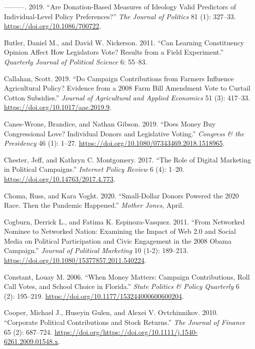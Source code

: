 \documentclass[12pt,]{article}
\begin{document}
\leavevmode\hypertarget{ref-bonica2019}{}%
---------. 2019. ``Are Donation-Based Measures of Ideology Valid
Predictors of Individual-Level Policy Preferences?'' \emph{The Journal
of Politics} 81 (1): 327--33. \url{https://doi.org/10.1086/700722}.

\leavevmode\hypertarget{ref-butler2011}{}%
Butler, Daniel M., and David W. Nickerson. 2011. ``Can Learning
Constituency Opinion Affect How Legislators Vote? Results from a Field
Experiment.'' \emph{Quarterly Journal of Political Science} 6: 55--83.

\leavevmode\hypertarget{ref-callahan2019}{}%
Callahan, Scott. 2019. ``Do Campaign Contributions from Farmers
Influence Agricultural Policy? Evidence from a 2008 Farm Bill Amendment
Vote to Curtail Cotton Subsidies.'' \emph{Journal of Agricultural and
Applied Economics} 51 (3): 417--33.
\url{https://doi.org/10.1017/aae.2019.9}.

\leavevmode\hypertarget{ref-caneswrone2019}{}%
Canes-Wrone, Brandice, and Nathan Gibson. 2019. ``Does Money Buy
Congressional Love? Individual Donors and Legislative Voting.''
\emph{Congress \& the Presidency} 46 (1): 1--27.
\url{https://doi.org/10.1080/07343469.2018.1518965}.

\leavevmode\hypertarget{ref-chester2017}{}%
Chester, Jeff, and Kathryn C. Montgomery. 2017. ``The Role of Digital
Marketing in Political Campaigns.'' \emph{Internet Policy Review} 6 (4):
1--20. \url{https://doi.org/10.14763/2017.4.773}.

\leavevmode\hypertarget{ref-choma2020}{}%
Choma, Russ, and Kara Voght. 2020. ``Small-Dollar Donors Powered the
2020 Race. Then the Pandemic Happened.'' \emph{Mother Jones}, April.

\leavevmode\hypertarget{ref-cogburn2011}{}%
Cogburn, Derrick L., and Fatima K. Espinoza-Vasquez. 2011. ``From
Networked Nominee to Networked Nation: Examining the Impact of Web 2.0
and Social Media on Political Participation and Civic Engagement in the
2008 Obama Campaign.'' \emph{Journal of Political Marketing} 10 (1-2):
189--213. \url{https://doi.org/10.1080/15377857.2011.540224}.

\leavevmode\hypertarget{ref-constant2006}{}%
Constant, Louay M. 2006. ``When Money Matters: Campaign Contributions,
Roll Call Votes, and School Choice in Florida.'' \emph{State Politics \&
Policy Quarterly} 6 (2): 195--219.
\url{https://doi.org/10.1177/153244000600600204}.

\leavevmode\hypertarget{ref-cooper2010}{}%
Cooper, Michael J., Huseyin Gulen, and Alexei V. Ovtchinnikov. 2010.
``Corporate Political Contributions and Stock Returns.'' \emph{The
Journal of Finance} 65 (2): 687--724.
\url{https://doi.org/https://doi.org/10.1111/j.1540-6261.2009.01548.x}.
\end{document}
